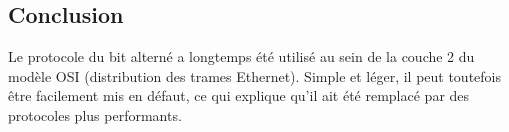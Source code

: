 \documentclass[a4paper,dvipsnames]{article}
\begin{document}
\begin{exercice}[breakable]{}{}
  \begin{center}
  \end{center}
\end{exercice}

\subsection{Conclusion}

Le protocole du bit alterné a longtemps été utilisé au sein de la couche 2 du modèle OSI (distribution des trames Ethernet). Simple et léger, il peut toutefois être facilement mis en défaut, ce qui explique qu'il ait été remplacé par des protocoles plus performants.
\end{document}
